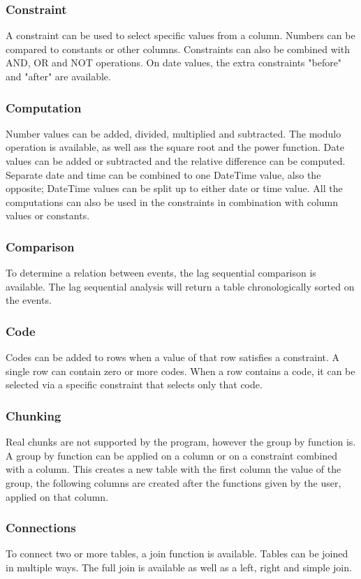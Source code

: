 \subsubsection{Constraint}
A constraint can be used to select specific values from a column. Numbers can be compared to constants or other columns. Constraints can also be combined with AND, OR and NOT operations. On date values, the extra constraints "before" and "after" are available. 
\subsubsection{Computation}
Number values can be added, divided, multiplied and subtracted. The modulo operation is available, as well ass the square root and the power function. Date values can be added or subtracted and the relative difference can be computed. Separate date and time can be combined to one DateTime value, also the opposite; DateTime values can be split up to either date or time value. All the computations can also be used in the constraints in combination with column values or constants.
\subsubsection{Comparison}
To determine a relation between events, the lag sequential comparison is available. The lag sequential analysis will return a table chronologically sorted on the events.
\subsubsection{Code}
Codes can be added to rows when a value of that row satisfies a constraint. A single row can contain zero or more codes. When a row contains a code, it can be selected via a specific constraint that selects only that code. 
\subsubsection{Chunking}
Real chunks are not supported by the program, however the group by function is. A group by function can be applied on a column or on a constraint combined with a column. This creates a new table with the first column the value of the group, the following columns are created after the functions given by the user, applied on that column.
\subsubsection{Connections}
To connect two or more tables, a join function is available. Tables can be joined in multiple ways. The full join is available as well as a left, right and simple join.
